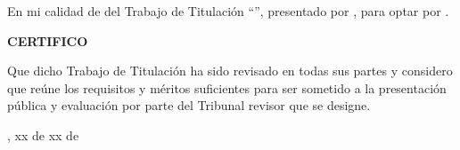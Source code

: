 
En mi calidad de \UTITutorEtiqueta{} del Trabajo de Titulación ``\UTITituloProyectoMayusculas'', presentado por \UTIAutoresTexto, para optar por \UTIFraseTituloProfesional{}.

\begin{center}
\textbf{CERTIFICO}
\end{center}

Que dicho Trabajo de Titulación ha sido revisado en todas sus partes y considero que reúne los requisitos y méritos suficientes para ser sometido a la presentación pública y evaluación por parte del Tribunal revisor que se designe.

\vspace{1.5cm}

\UTICiudadPais, xx de xx de \UTIAnio

\vspace{2.5cm}

\UTIFirmaTutorBloque